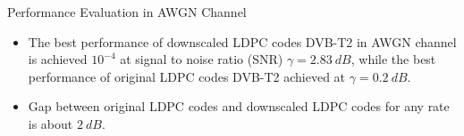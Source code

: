 \documentclass[11pt, aspectratio=169]{beamer}
\begin{document}
\begin{frame}{Performance Evaluation in AWGN Channel }
\begin{itemize}
\item \small
The best performance of downscaled LDPC codes DVB-T2 in AWGN channel is achieved $10^{-4}$ at signal to noise ratio (SNR) $\gamma = 2.83~dB$, while the best performance of original LDPC codes DVB-T2 achieved at  $\gamma = 0.2~dB$.
\item \small Gap between original LDPC codes and downscaled LDPC codes for any rate is about $2~dB$.
\end{itemize}

\end{frame}
\end{document}
